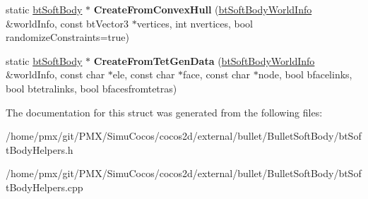 \begin{DoxyCompactItemize}
\item 
\mbox{\label{structbtSoftBodyHelpers_a3d1d3a92e3765a9445488cd098b3847d}} 
static \hyperlink{classbtSoftBody}{bt\+Soft\+Body} $\ast$ {\bfseries Create\+From\+Convex\+Hull} (\hyperlink{structbtSoftBodyWorldInfo}{bt\+Soft\+Body\+World\+Info} \&world\+Info, const bt\+Vector3 $\ast$vertices, int nvertices, bool randomize\+Constraints=true)
\item 
\mbox{\label{structbtSoftBodyHelpers_a33f3787c9208680112c66fa8b1757c77}} 
static \hyperlink{classbtSoftBody}{bt\+Soft\+Body} $\ast$ {\bfseries Create\+From\+Tet\+Gen\+Data} (\hyperlink{structbtSoftBodyWorldInfo}{bt\+Soft\+Body\+World\+Info} \&world\+Info, const char $\ast$ele, const char $\ast$face, const char $\ast$node, bool bfacelinks, bool btetralinks, bool bfacesfromtetras)
\end{DoxyCompactItemize}


The documentation for this struct was generated from the following files\+:\begin{DoxyCompactItemize}
\item 
/home/pmx/git/\+P\+M\+X/\+Simu\+Cocos/cocos2d/external/bullet/\+Bullet\+Soft\+Body/bt\+Soft\+Body\+Helpers.\+h\item 
/home/pmx/git/\+P\+M\+X/\+Simu\+Cocos/cocos2d/external/bullet/\+Bullet\+Soft\+Body/bt\+Soft\+Body\+Helpers.\+cpp\end{DoxyCompactItemize}
